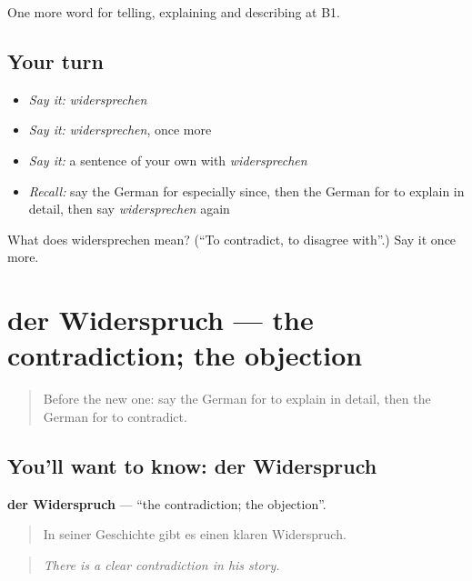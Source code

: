 \begin{grammarlens}[title={What you've built}]
One more word for telling, explaining and describing at B1.
\end{grammarlens}

\subsection*{Your turn}
\begin{itemize}
\raggedright
  \item \emph{Say it:} \emph{widersprechen}
  \item \emph{Say it:} \emph{widersprechen}, once more
  \item \emph{Say it:} a sentence of your own with \emph{widersprechen}
  \item \emph{Recall:} say the German for especially since, then the German for to explain in detail, then say \emph{widersprechen} again
\end{itemize}

\begin{tcolorbox}[breakable,colback=teal!4,colframe=teal!35!black,title={Before you move on}]
What does widersprechen mean? (\textquotedblleft{}To contradict, to disagree with\textquotedblright{}.) Say it once more.
\end{tcolorbox}
\section[der Widerspruch]{der Widerspruch — the contradiction; the objection}

\label{lesson:GE-C333-widerspruch}



\begin{quote}
Before the new one: say the German for to explain in detail, then the German for to contradict.
\end{quote}

\subsection*{You'll want to know: der Widerspruch}
\textbf{der Widerspruch} — \textquotedblleft{}the contradiction; the objection\textquotedblright{}.

\begin{quote}
In seiner Geschichte gibt es einen klaren Widerspruch.
\end{quote}

\begin{quote}
\emph{There is a clear contradiction in his story.}
\end{quote}

